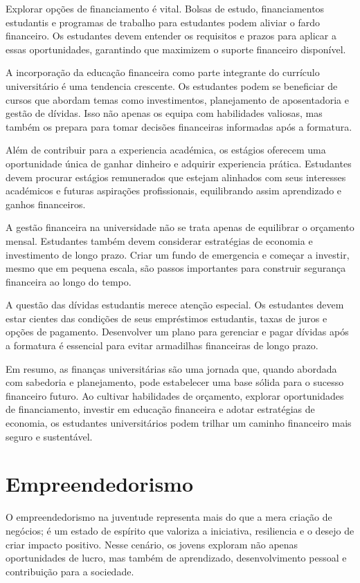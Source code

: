 \documentclass{report}
\begin{document}
Explorar opções de financiamento é vital. Bolsas de estudo, financiamentos estudantis e programas de trabalho para estudantes podem aliviar o fardo financeiro. Os estudantes devem entender os requisitos e prazos para aplicar a essas oportunidades, garantindo que maximizem o suporte financeiro disponível.

A incorporação da educação financeira como parte integrante do currículo universitário é uma tendencia crescente. Os estudantes podem se beneficiar de cursos que abordam temas como investimentos, planejamento de aposentadoria e gestão de dívidas. Isso não apenas os equipa com habilidades valiosas, mas também os prepara para tomar decisões financeiras informadas após a formatura.

Além de contribuir para a experiencia académica, os estágios oferecem uma oportunidade única de ganhar dinheiro e adquirir experiencia prática. Estudantes devem procurar estágios remunerados que estejam alinhados com seus interesses académicos e futuras aspirações profissionais, equilibrando assim aprendizado e ganhos financeiros.

A gestão financeira na universidade não se trata apenas de equilibrar o orçamento mensal. Estudantes também devem considerar estratégias de economia e investimento de longo prazo. Criar um fundo de emergencia e começar a investir, mesmo que em pequena escala, são passos importantes para construir segurança financeira ao longo do tempo.

A questão das dívidas estudantis merece atenção especial. Os estudantes devem estar cientes das condições de seus empréstimos estudantis, taxas de juros e opções de pagamento. Desenvolver um plano para gerenciar e pagar dívidas após a formatura é essencial para evitar armadilhas financeiras de longo prazo.

Em resumo, as finanças universitárias são uma jornada que, quando abordada com sabedoria e planejamento, pode estabelecer uma base sólida para o sucesso financeiro futuro. Ao cultivar habilidades de orçamento, explorar oportunidades de financiamento, investir em educação financeira e adotar estratégias de economia, os estudantes universitários podem trilhar um caminho financeiro mais seguro e sustentável.

\section{Empreendedorismo}
\label{}

O empreendedorismo na juventude representa mais do que a mera criação de negócios; é um estado de espírito que valoriza a iniciativa, resiliencia e o desejo de criar impacto positivo. Nesse cenário, os jovens exploram não apenas oportunidades de lucro, mas também de aprendizado, desenvolvimento pessoal e contribuição para a sociedade.
\end{document}
